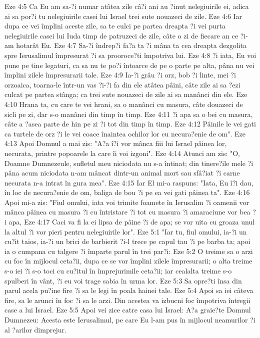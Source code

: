 Eze 4:5  Ca Eu am sa-?i numar atâtea zile câ?i ani au ?inut nelegiuirile ei, adica ai sa por?i tu nelegiuirile casei lui Israel trei sute nouazeci de zile.
Eze 4:6  Iar dupa ce vei împlini aceste zile, sa te culci pe partea dreapta ?i vei purta nelegiuirile casei lui Iuda timp de patruzeci de zile, câte o zi de fiecare an ce ?i-am hotarât Eu.
Eze 4:7  Sa-?i îndrep?i fa?a ta ?i mâna ta cea dreapta dezgolita spre Ierusalimul împresurat ?i sa prooroce?ti împotriva lui.
Eze 4:8  ?i iata, Eu voi pune pe tine legaturi, ca sa nu te po?i întoarce de pe o parte pe alta, pâna nu vei împlini zilele împresurarii tale.
Eze 4:9  Ia-?i grâu ?i orz, bob ?i linte, mei ?i orzoaica, toarna-le într-un vas ?i-?i fa din ele atâtea pâini, câte zile ai sa ?ezi culcat pe partea stânga; ca trei sute nouazeci de zile ai sa manânci din ele.
Eze 4:10  Hrana ta, cu care te vei hrani, sa o manânci cu masura, câte douazeci de sicli pe zi, dar s-o manânci din timp în timp.
Eze 4:11  ?i apa sa o bei cu masura, câte a ?asea parte de hin pe zi ?i tot din timp în timp.
Eze 4:12  Pâinile le vei gati ca turtele de orz ?i le vei coace înaintea ochilor lor cu necura?enie de om".
Eze 4:13  Apoi Domnul a mai zis: "A?a î?i vor mânca fiii lui Israel pâinea lor, necurata, printre popoarele la care îi voi izgoni".
Eze 4:14  Atunci am zis: "O, Doamne Dumnezeule, sufletul meu niciodata nu s-a întinat; din tinere?ile mele ?i pâna acum niciodata n-am mâncat dintr-un animal mort sau sfâ?iat ?i carne necurata n-a intrat în gura mea".
Eze 4:15  Iar El mi-a raspuns: "Iata, Eu î?i dau, în loc de necura?enie de om, baliga de bou ?i pe ea vei gati pâinea ta".
Eze 4:16  Apoi mi-a zis: "Fiul omului, iata voi trimite foamete în Ierusalim ?i oamenii vor mânca pâinea cu masura ?i cu întristare ?i tot cu masura ?i amaraciune vor bea ?i apa,
Eze 4:17  Caci va fi la ei lipsa de pâine ?i de apa; se vor uita cu groaza unul la altul ?i vor pieri pentru nelegiuirile lor".
Eze 5:1  "Iar tu, fiul omului, ia-?i un cu?it taios, ia-?i un brici de barbierit ?i-l trece pe capul tau ?i pe barba ta; apoi ia o cumpana cu talgere ?i împarte parul în trei par?i:
Eze 5:2  O treime sa o arzi cu foc în mijlocul ceta?ii, dupa ce se vor împlini zilele împresurarii; o alta treime s-o iei ?i s-o toci cu cu?itul în împrejurimile ceta?ii; iar cealalta treime s-o spulberi în vânt, ?i eu voi trage sabia în urma lor.
Eze 5:3  Sa opre?ti însa din parul acela pu?ine fire ?i sa le legi în poala hainei tale.
Eze 5:4  Apoi sa iei câteva fire, sa le arunci în foc ?i sa le arzi. Din acestea va izbucni foc împotriva întregii case a lui Israel.
Eze 5:5  Apoi vei zice catre casa lui Israel: A?a graie?te Domnul Dumnezeu: Acesta este Ierusalimul, pe care Eu l-am pus în mijlocul neamurilor ?i al ?arilor dimprejur.
